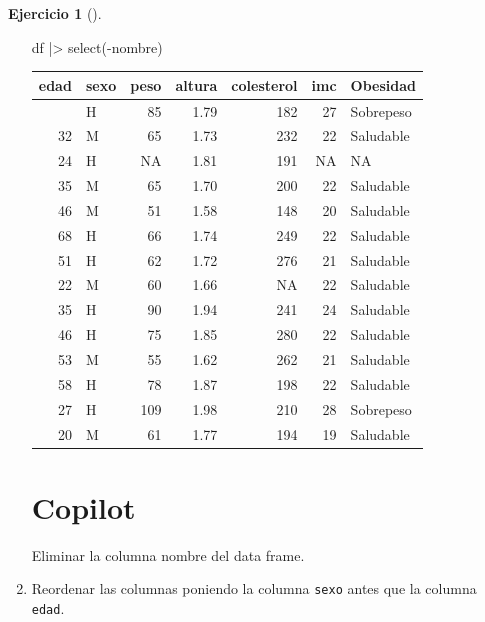 \documentclass[
  a4paper,
]{scrreport}
\newenvironment{Shaded}{\begin{snugshade}}{\end{snugshade}}
\newcommand{\ExtensionTok}[1]{\textcolor[rgb]{0.00,0.23,0.31}{#1}}
\newcommand{\FunctionTok}[1]{\textcolor[rgb]{0.28,0.35,0.67}{#1}}
\newcommand{\NormalTok}[1]{\textcolor[rgb]{0.00,0.23,0.31}{#1}}
\newcommand{\SpecialCharTok}[1]{\textcolor[rgb]{0.37,0.37,0.37}{#1}}
\theoremstyle{definition}
\newtheorem{exercise}{Ejercicio}[chapter]
\theoremstyle{remark}
\begin{document}
\begin{exercise}[]
\begin{enumerate}
\begin{tcolorbox}
\begin{Shaded}
\begin{Highlighting}[]
\NormalTok{df }\SpecialCharTok{|\textgreater{}} \FunctionTok{select}\NormalTok{(}\SpecialCharTok{{-}}\NormalTok{nombre)}
\end{Highlighting}
\end{Shaded}

  \begin{longtable}[]{@{}rlrrrrl@{}}
  \toprule\noalign{}
  edad & sexo & peso & altura & colesterol & imc & Obesidad \\
  \midrule\noalign{}
  \endhead
  \bottomrule\noalign{}
  \endlastfoot
  18 & H & 85 & 1.79 & 182 & 27 & Sobrepeso \\
  32 & M & 65 & 1.73 & 232 & 22 & Saludable \\
  24 & H & NA & 1.81 & 191 & NA & NA \\
  35 & M & 65 & 1.70 & 200 & 22 & Saludable \\
  46 & M & 51 & 1.58 & 148 & 20 & Saludable \\
  68 & H & 66 & 1.74 & 249 & 22 & Saludable \\
  51 & H & 62 & 1.72 & 276 & 21 & Saludable \\
  22 & M & 60 & 1.66 & NA & 22 & Saludable \\
  35 & H & 90 & 1.94 & 241 & 24 & Saludable \\
  46 & H & 75 & 1.85 & 280 & 22 & Saludable \\
  53 & M & 55 & 1.62 & 262 & 21 & Saludable \\
  58 & H & 78 & 1.87 & 198 & 22 & Saludable \\
  27 & H & 109 & 1.98 & 210 & 28 & Sobrepeso \\
  20 & M & 61 & 1.77 & 194 & 19 & Saludable \\
  \end{longtable}

  \section{Copilot}

\begin{Shaded}
\begin{Highlighting}[]
\ExtensionTok{Eliminar}\NormalTok{ la columna nombre del data frame.}
\end{Highlighting}
\end{Shaded}

  \end{tcolorbox}
\item
  Reordenar las columnas poniendo la columna \texttt{sexo} antes que la
  columna \texttt{edad}.


\end{enumerate}
\end{exercise}
\end{document}
